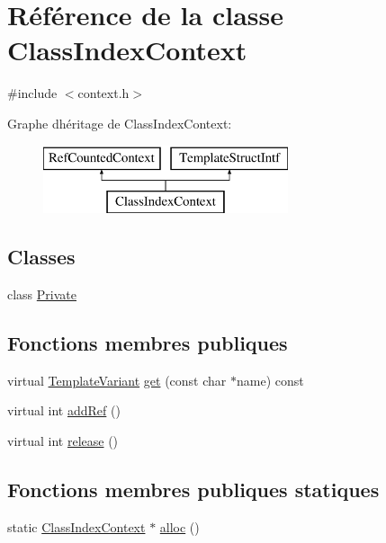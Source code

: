 \hypertarget{class_class_index_context}{}\section{Référence de la classe Class\+Index\+Context}
\label{class_class_index_context}


{\ttfamily \#include $<$context.\+h$>$}

Graphe d\textquotesingle{}héritage de Class\+Index\+Context\+:\begin{figure}[H]
\begin{center}
\leavevmode
\includegraphics[height=2.000000cm]{class_class_index_context}
\end{center}
\end{figure}
\subsection*{Classes}
\begin{DoxyCompactItemize}
\item 
class \hyperlink{class_class_index_context_1_1_private}{Private}
\end{DoxyCompactItemize}
\subsection*{Fonctions membres publiques}
\begin{DoxyCompactItemize}
\item 
virtual \hyperlink{class_template_variant}{Template\+Variant} \hyperlink{class_class_index_context_a62c6b97f730fafbce306f2a3b4c4df26}{get} (const char $\ast$name) const 
\item 
virtual int \hyperlink{class_class_index_context_a0bf6831cd085ad22ded6b29bfcb8f0bd}{add\+Ref} ()
\item 
virtual int \hyperlink{class_class_index_context_ade13f5057c83883e9cb22b5ccd2eead6}{release} ()
\end{DoxyCompactItemize}
\subsection*{Fonctions membres publiques statiques}
\begin{DoxyCompactItemize}
\item 
static \hyperlink{class_class_index_context}{Class\+Index\+Context} $\ast$ \hyperlink{class_class_index_context_a1955976d7c7f2ed3aa099e49e87c03b2}{alloc} ()
\end{DoxyCompactItemize}



